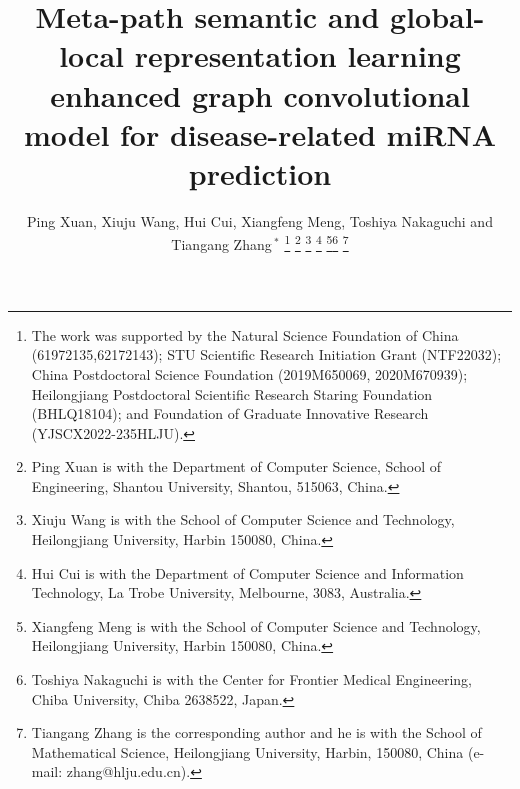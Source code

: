 \documentclass[journal,twoside,web]{ieeecolor}
\begin{document}
\title{Meta-path semantic and global-local representation learning enhanced graph convolutional model for disease-related miRNA prediction}
\author{Ping Xuan, Xiuju Wang, Hui Cui, Xiangfeng Meng, Toshiya Nakaguchi and Tiangang Zhang\,$^{*}$
\thanks{The work was supported by the Natural Science Foundation of China (61972135,62172143); STU Scientific Research Initiation Grant (NTF22032); China Postdoctoral Science Foundation (2019M650069, 2020M670939); Heilongjiang Postdoctoral Scientific Research Staring Foundation (BHLQ18104); and Foundation of Graduate Innovative Research (YJSCX2022-235HLJU).}
\thanks{Ping Xuan is with the Department of Computer Science, School of Engineering, Shantou University, Shantou, 515063, China.}
\thanks{Xiuju Wang is with the School of Computer Science and Technology, Heilongjiang University, Harbin 150080, China.}
\thanks{Hui Cui is with the Department of Computer Science and Information Technology, La Trobe University, Melbourne, 3083, Australia.}
\thanks{Xiangfeng Meng is with the School of Computer Science and Technology, Heilongjiang University, Harbin 150080, China.}\thanks{Toshiya Nakaguchi is with the Center for Frontier Medical Engineering, Chiba University, Chiba 2638522, Japan.}
\thanks{Tiangang Zhang is the corresponding author and he is with the School of Mathematical Science, Heilongjiang University, Harbin, 150080, China (e-mail: zhang@hlju.edu.cn).}
}

\maketitle
\end{document}
